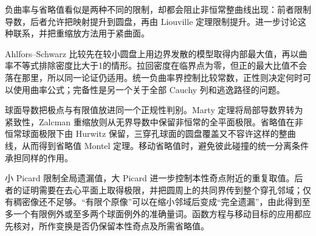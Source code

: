 \ProseParagraphBreak
负曲率与省略值看似是两种不同的限制，却都会阻止非恒常整曲线出现：前者限制导数，后者允许把映射提升到圆盘，再由 Liouville 定理限制提升。进一步讨论这种联系，并把重缩放方法用于紧曲面。








\begin{chaptersummary}
Ahlfors--Schwarz 比较先在较小圆盘上用边界发散的模型取得内部最大值，再以曲率不等式排除密度比大于1的情形。拉回密度在临界点为零，但正的最大比值不会落在那里，所以同一论证仍适用。统一负曲率界控制比较常数，正性则决定何时可以使用曲率公式；完备性是另一个关于全部 Cauchy 列和逃逸路径的问题。

\ProseParagraphBreak
球面导数把极点与有限值放进同一个正规性判别。Marty 定理将局部导数界转为紧致性，Zalcman 重缩放则从无界导数中保留非恒常的全平面极限。省略值在非恒常球面极限下由 Hurwitz 保留，三穿孔球面的圆盘覆盖又不容许这样的整曲线，从而得到省略值 Montel 定理。移动省略值时，避免彼此碰撞的统一分离条件承担同样的作用。

\ProseParagraphBreak
小 Picard 限制全局遗漏值，大 Picard 进一步控制本性奇点附近的重复取值。后者的证明需要在去心平面上取得极限，并把圆周上的共同界传到整个穿孔邻域；仅有稠密像还不足够。“有限个原像”可以在缩小邻域后变成“完全遗漏”，由此得到至多一个有限例外或至多两个球面例外的准确量词。函数方程与移动目标的应用都应先核对，所作变换是否仍保留本性奇点及所需省略值。
\end{chaptersummary}

\BookExercises

